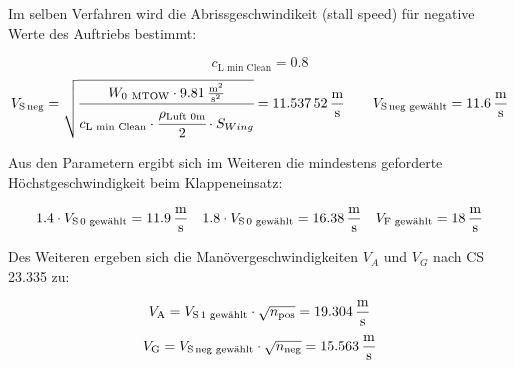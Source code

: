 Im selben Verfahren wird die Abrissgeschwindikeit (stall speed) für negative Werte des Auftriebs bestimmt:

\begin{equation}
\label{eq:K7}
c_{\text{L\ min\ Clean}} = 0.8 
\end{equation}
\begin{equation}
\label{eq:K8}
V_{\text{S\,neg}} = \sqrt{\cfrac{W_{0\ \text{MTOW}} \cdot \SI[per-mode = fraction]{9,81}{\meter\squared\per\second\squared}}{c_{\text{L\ min\ Clean}} \cdot \cfrac{\rho_{\text{Luft\ 0m}}}{2} \cdot S_{Wing}}}=\SI[per-mode = fraction]{11,53752}{\meter\per\second} \qquad V_{\text{S\,neg\ gewählt}}=\SI[per-mode = fraction]{11,6}{\meter\per\second}
\end{equation}


Aus den Parametern ergibt sich im Weiteren die mindestens geforderte Höchstgeschwindigkeit beim Klappeneinsatz:

\begin{equation}
\label{eq:K8}
1.4 \cdot V_{\text{S\,0\ gewählt}}=\SI[per-mode = fraction]{11,9}{\meter\per\second} \quad
1.8 \cdot V_{\text{S\,0\ gewählt}}=\SI[per-mode = fraction]{16,38}{\meter\per\second} \quad
V_{\text{F\ gewählt}}=\SI[per-mode = fraction]{18}{\meter\per\second}
\end{equation}


Des Weiteren ergeben sich die Manövergeschwindigkeiten $V_{A}$ und $V_{G}$ nach CS 23.335 zu:

\begin{equation}
\label{eq:K8}
V_{\text{A}}=V_{\text{S\,1\ gewählt}} \cdot \sqrt{n_{\text{pos}}}=\SI[per-mode = fraction]{19,304}{\meter\per\second} 
\end{equation}
\begin{equation}
\label{eq:K8}
V_{\text{G}}=V_{\text{S\,neg\ gewählt}} \cdot \sqrt{n_{\text{neg}}}=\SI[per-mode = fraction]{15,563}{\meter\per\second} 
\end{equation}

